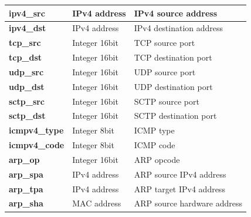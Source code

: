 \documentclass[12pt, oneside]{book}
\begin{document}
\begin{longtable}{|l|l|l|}
	\textbf{ipv4\_src}        & IPv4 address   & IPv4 source address                                                                                    \\ \hline
	\textbf{ipv4\_dst}        & IPv4 address   & IPv4 destination address                                                                               \\ \hline
	\textbf{tcp\_src}         & Integer 16bit  & TCP source port                                                                                        \\ \hline
	\textbf{tcp\_dst}         & Integer 16bit  & TCP destination port                                                                                   \\ \hline
	\textbf{udp\_src}         & Integer 16bit  & UDP source port                                                                                        \\ \hline
	\textbf{udp\_dst}         & Integer 16bit  & UDP destination port                                                                                   \\ \hline
	\textbf{sctp\_src}        & Integer 16bit  & SCTP source port                                                                                       \\ \hline
	\textbf{sctp\_dst}        & Integer 16bit  & SCTP destination port                                                                                  \\ \hline
	\textbf{icmpv4\_type}     & Integer 8bit   & ICMP type                                                                                              \\ \hline
	\textbf{icmpv4\_code}     & Integer 8bit   & ICMP code                                                                                              \\ \hline
	\textbf{arp\_op}          & Integer 16bit  & ARP opcode                                                                                             \\ \hline
	\textbf{arp\_spa}         & IPv4 address   & ARP source IPv4 address                                                                                \\ \hline
	\textbf{arp\_tpa}         & IPv4 address   & ARP target IPv4 address                                                                                \\ \hline
	\textbf{arp\_sha}         & MAC address    & ARP source hardware address                                                                            \\ \hline

\end{longtable}
\end{document}
